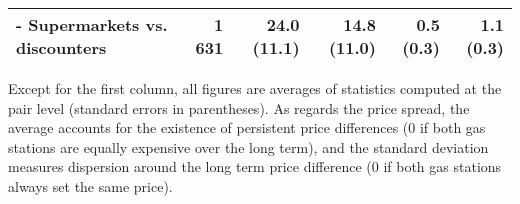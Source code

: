 \documentclass[english]{article}
\begin{document}
\begin{table}[H]
\begin{threeparttable}
\begin{tabular}{lrrrrr}
    \hspace*{4mm} - Supermarkets vs. discounters & 1 631 & 24.0 (11.1) & 14.8 (11.0) & 0.5 (0.3) & 1.1 (0.3) \\
    \bottomrule
    \bottomrule
\end{tabular}
\begin{tablenotes}
			\small
      \item Except for the first column, all figures are averages of statistics computed at the pair level (standard errors in parentheses). As regards the price spread, the average accounts for the existence of persistent price differences (0 if both gas stations are equally expensive over the long term), and the standard deviation measures dispersion around the long term price difference (0 if both gas stations always set the same price).
\end{tablenotes}
\end{threeparttable}
\end{table}
\end{document}
